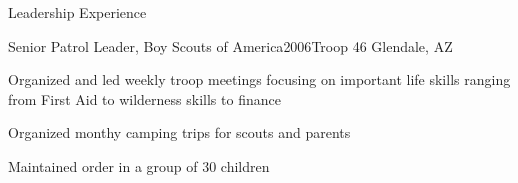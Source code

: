 \documentclass{resume} %
\begin{document}
\begin{rSection}{Leadership Experience}
\begin{rSubsection}{Senior Patrol Leader, Boy Scouts of America}{2006}{Troop 46 Glendale, AZ}{}
\item Organized and led weekly troop meetings focusing on important life skills ranging from First Aid to wilderness skills to finance
\item Organized monthy camping trips for scouts and parents
\item Maintained order in a group of 30 children
\end{rSubsection}

\end{rSection}

\end{document}
